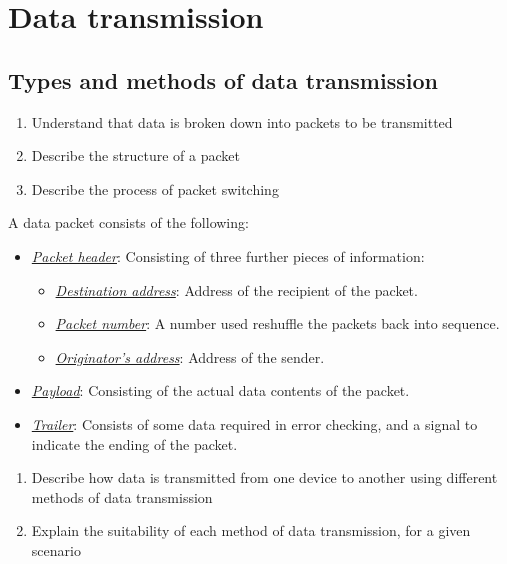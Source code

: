 \section{Data transmission}
\subsection{Types and methods of data transmission}
\begin{point}
	\begin{enumerate}[label=(\alph*)]
		\setlength\itemsep{0em}
		\item Understand that data is broken down into
			packets to be transmitted
		\item Describe the structure of a packet
		\item Describe the process of packet switching
	\end{enumerate}
\end{point}

A data packet consists of the following:
\begin{itemize}
	\item \emph{\ul{Packet header}}: Consisting of three 
		further pieces of information:
		\begin{itemize}
			\item \emph{\ul{Destination address}}: Address
				of the recipient of the packet.
			\item \emph{\ul{Packet number}}: A number used 
				reshuffle the packets back into sequence.
			\item \emph{\ul{Originator's address}}: Address
				of the sender.
		\end{itemize}
	\item \emph{\ul{Payload}}: Consisting of the actual 
		data contents of the packet.
	\item \emph{\ul{Trailer}}: Consists of some data
		required in error checking, and a signal to
		indicate the ending of the packet.
\end{itemize}

\begin{point}
	\begin{enumerate}[label=(\alph*)]
		\setlength\itemsep{0em}
		\item Describe how data is transmitted from one
			device to another using different methods
			of data transmission
		\item Explain the suitability of each method of
			data transmission, for a given scenario
	\end{enumerate}
\end{point}

